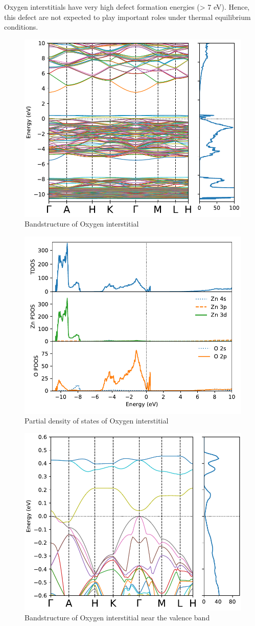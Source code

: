 Oxygen interstitials have very high defect formation energies (> 7 eV). Hence, this defect are not expected to play important roles under thermal equilibrium conditions.
\begin{figure}[tbh!]
	\centering
	\includegraphics[width=0.6\linewidth]{"images/rnd/band-dos_O_i"}
	\caption[Bandstructure of Oxygen interstitial]{Bandstructure of Oxygen interstitial}
	\label{fig:band-dos_O_i}
\end{figure}

\begin{figure}[tbh!]
	\centering
	\includegraphics[width=0.6\linewidth]{"images/rnd/dos-pdos_O_i"}
	\caption[Partial density of states of Oxygen interstitial]{Partial density of states of Oxygen interstitial}
	\label{fig:dos-pdos_O_i}
\end{figure}

\begin{figure}[tbh!]
	\centering
	\includegraphics[width=0.6\linewidth]{"images/rnd/band-dos-close_O_i"}
	\caption[Bandstructure of Oxygen interstitial near the valence band]{Bandstructure of Oxygen interstitial near the valence band}
	\label{fig:band-dos-close_O_i}
\end{figure}

